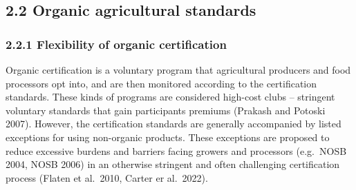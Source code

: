 \documentclass[twoside,12pt,final]{ucthesis-CA2012}
\begin{document}
\begin{ucmainmatter}
\hypertarget{organic-agricultural-standards}{%
\subsection{2.2 Organic agricultural standards}\label{organic-agricultural-standards}}

\hypertarget{flexibility-of-organic-certification}{%
\subsubsection{2.2.1 Flexibility of organic certification}\label{flexibility-of-organic-certification}}

Organic certification is a voluntary program that agricultural producers
and food processors opt into, and are then monitored according to the
certification standards. These kinds of programs are considered
high-cost clubs -- stringent voluntary standards that gain participants
premiums (Prakash and Potoski 2007). However, the certification
standards are generally accompanied by listed exceptions for using
non-organic products. These exceptions are proposed to reduce excessive
burdens and barriers facing growers and processors (e.g.~NOSB 2004, NOSB
2006) in an otherwise stringent and often challenging certification
process (Flaten et al.~2010, Carter er al.~2022).


\end{ucmainmatter}
\end{document}
